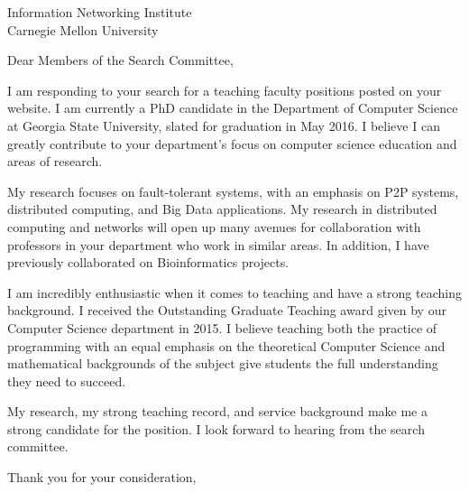 \documentclass[12pt]{letter}
\date{}
\begin{document}
 
\begin{letter}{Information Networking Institute \\Carnegie Mellon University} 
\opening{Dear Members of the Search Committee,} 
 
I am responding to your search for a teaching faculty positions posted on your website.
I am currently a PhD candidate in the Department of Computer Science at Georgia State University, slated for graduation in May 2016.
I believe I can greatly contribute to your department's focus on computer science education and areas of research.

My research focuses on fault-tolerant systems, with an emphasis on P2P systems, distributed computing, and Big Data applications.
My research in distributed computing and networks will open up many avenues for collaboration with professors in your department who work in similar areas.
In addition, I have previously collaborated on Bioinformatics projects.



I am incredibly enthusiastic when it comes to teaching and have a strong teaching background.
I received the Outstanding Graduate Teaching award given by our Computer Science department in 2015.
I believe teaching both the practice of programming with an equal emphasis on the theoretical Computer Science and mathematical backgrounds of the subject give students the full understanding they need to succeed.




My research, my strong teaching record, and service background make me a strong candidate for the position.
I look forward to hearing from the search committee.


\closing{Thank you for your consideration,} 
\end{letter} 
\end{document}
